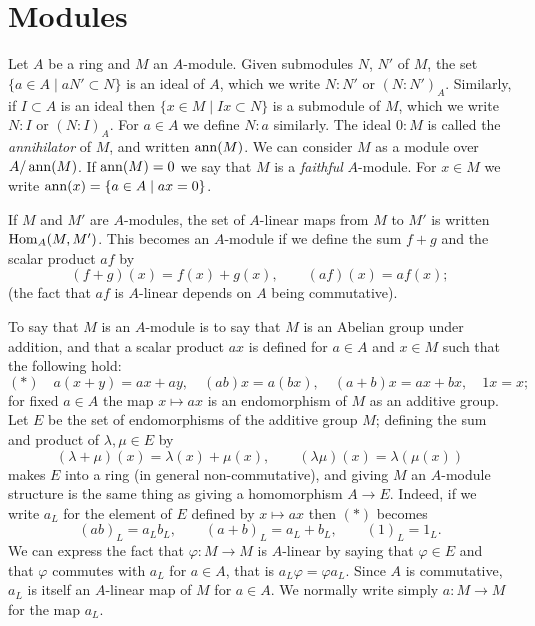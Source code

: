 \section{Modules}\label{sec:2}

Let $A$ be a ring and $M$ an $A$-module. Given submodules $N$, $N'$
of $M$, the set $\{a \in A \mid aN' \subset N\}$ is an ideal of $A$, which we write $N:N'$
or $(N:N')_A$. Similarly, if $I \subset A$ is an ideal then $\{x \in M \mid Ix \subset N\}$ is a
submodule of $M$, which we write $N:I$ or $(N:I)_A$. For $a \in A$ we define
$N:a$ similarly. The ideal $0:M$ is called the \emph{annihilator} of $M$, and written
$\operatorname{ann}(M)$. We can consider $M$ as a module over $A/\operatorname{ann}(M)$. If $\operatorname{ann}(M) = 0$
we say that $M$ is a \emph{faithful} $A$-module. For $x \in M$ we write
$\operatorname{ann}(x) = \{a \in A \mid ax = 0\}$.

If $M$ and $M'$ are $A$-modules, the set of $A$-linear maps from $M$ to $M'$
is written $\operatorname{Hom}_A(M, M')$. This becomes an $A$-module if we define the sum
$f + g$ and the scalar product $af$ by
\[
  (f + g)(x) = f(x) + g(x), \qquad (af)(x) = af(x);
\]
(the fact that $af$ is $A$-linear depends on $A$ being commutative).

To say that $M$ is an $A$-module is to say that $M$ is an Abelian group
under addition, and that a scalar product $ax$ is defined for $a \in A$ and
$x \in M$ such that the following hold:
\[
  (*) \quad a(x + y) = ax + ay, \quad (ab)x = a(bx), \quad (a + b)x = ax + bx, \quad 1x = x;
\]
for fixed $a \in A$ the map $x \mapsto ax$ is an endomorphism of $M$ as an additive
group. Let $E$ be the set of endomorphisms of the additive group $M$;
defining the sum and product of $\lambda, \mu \in E$ by
\[
  (\lambda + \mu)(x) = \lambda(x) + \mu(x), \qquad (\lambda\mu)(x) = \lambda(\mu(x))
\]
makes $E$ into a ring (in general non-commutative), and giving $M$ an
$A$-module structure is the same thing as giving a homomorphism
$A \to E$. Indeed, if we write $a_L$ for the element of $E$ defined by $x \mapsto ax$ then
$(*)$ becomes
\[
  (ab)_L = a_Lb_L, \qquad (a + b)_L = a_L + b_L, \qquad (1)_L = 1_L.
\]
We can express the fact that $\varphi\colon M \to M$ is $A$-linear by saying that
$\varphi \in E$ and that $\varphi$ commutes with $a_L$ for $a \in A$, that is $a_L\varphi = \varphi a_L$. Since
$A$ is commutative, $a_L$ is itself an $A$-linear map of $M$ for $a \in A$. We normally
write simply $a\colon M \to M$ for the map $a_L$.

